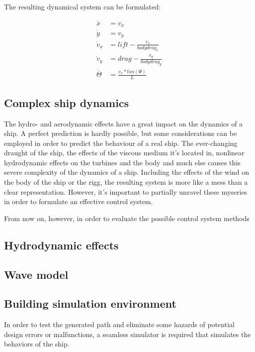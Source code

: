 The resulting dynamical system can be formulated:

\begin{align}
		\dot{x} &= v_x
	\\	\dot{y} &= v_y
	\\	\dot{v}_x &= lift - \frac{v_x}{bodydrag_x}
	\\	\dot{v}_y &= drag - \frac{v_y}{bodydrag_y}
	\\	\dot{\Theta} &= \frac{v_x * tan(\Phi)}{L}
\end{align}

\subsection{Complex ship dynamics}

The hydro- and aerodynamic effects have a great impact on the dynamics of a ship. A perfect prediction is hardly possible, but some considerations can be employed in order to predict the behaviour of a real ship.
The ever-changing draught of the ship, the effects of the viscous medium it’s located in, nonlinear hydrodynamic effects on the turbines and the body and much else causes this severe complexity of the dynamics of a ship. Including the effects of the wind on the body of the ship or the rigg, the resulting system is more like a mess than a clear representation.
However, it’s important to partially unravel these myseries in order to formulate an effective control system.

From now on, however, in order to evaluate the possible control system methods 

\subsection{Hydrodynamic effects}

\subsection{Wave model}

\subsection{Building simulation environment}

In order to test the generated path and eliminate some hazards of potential design errors or malfunctions, a seamless simulator is required that simulates the behaviors of the ship. \\

